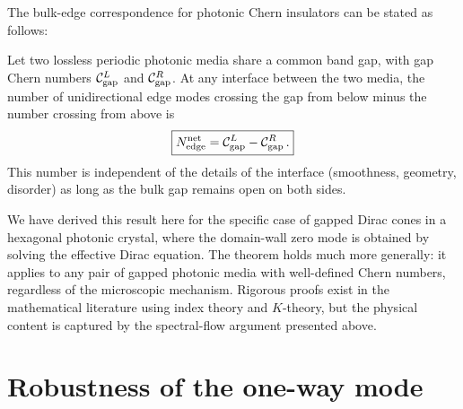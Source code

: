 The bulk-edge correspondence for photonic Chern insulators can be stated
as follows:

\begin{theorem}
  \label{thm:ch8-bec}
  Let two lossless periodic photonic media share a common band gap, with
  gap Chern numbers $\mathcal{C}^L_{\mathrm{gap}}$ and
  $\mathcal{C}^R_{\mathrm{gap}}$.  At any interface between the two media,
  the number of unidirectional edge modes crossing the gap from below
  minus the number crossing from above is
  \begin{equation}\label{eq:ch8-bec}
    \boxed{%
    N_{\mathrm{edge}}^{\mathrm{net}}
    = \Chern^L_{\mathrm{gap}} - \Chern^R_{\mathrm{gap}}\,.}
  \end{equation}
  This number is independent of the details of the interface
  (smoothness, geometry, disorder) as long as the bulk gap remains
  open on both sides.
\end{theorem}

\begin{remark}
  We have derived this result here for the specific case of gapped Dirac
  cones in a hexagonal photonic crystal, where the domain-wall zero mode
  is obtained by solving the effective Dirac equation.  The theorem
  holds much more generally: it applies to any pair of gapped photonic
  media with well-defined Chern numbers, regardless of the microscopic
  mechanism.  Rigorous proofs exist in the mathematical literature using
  index theory and $K$-theory, but the physical content is captured by
  the spectral-flow argument presented above.
\end{remark}

\section{Robustness of the one-way mode}
\label{sec:ch8-robustness}

